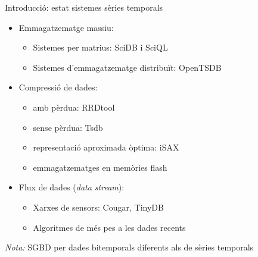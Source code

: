\begin{frame}{Introducció: estat sistemes sèries temporals}
  \begin{itemize}

  \item Emmagatzematge massiu:
    \begin{itemize}
     \item Sistemes per matrius: SciDB i SciQL
     \item Sistemes d'emmagatzematge distribuït: OpenTSDB
    \end{itemize}
  \item Compressió de dades:
    \begin{itemize}
    \item amb pèrdua: RRDtool
    \item sense pèrdua: Tsdb
    \item representació aproximada òptima: iSAX
    \item  emmagatzematges en memòries flash  %
    \end{itemize}

  \item Flux de dades (\emph{data stream}): 
    \begin{itemize}
    \item Xarxes de sensors: Cougar, TinyDB
    \item Algoritmes de més pes a les dades recents \parencite{cormode08:pods}
    \end{itemize}


\end{itemize}


\emph{Nota:} SGBD per dades bitemporals diferents als de sèries temporals \parencite{schmidt95}


\end{frame}


